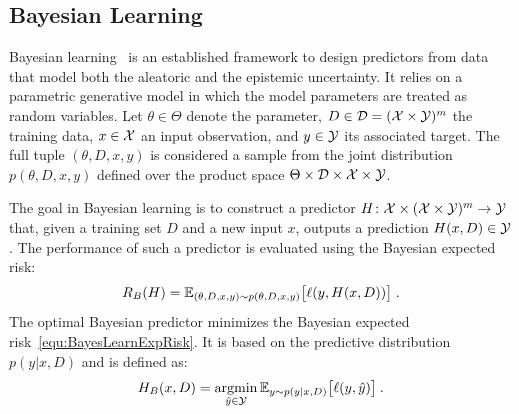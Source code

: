 \subsection{Bayesian Learning}

Bayesian learning~\cite{Bishop-PRML-2006,Gelman-Bayesian-2013} is an established framework to design predictors from data that model both the aleatoric and the epistemic uncertainty. It relies on a parametric generative model in which the model parameters are treated as random variables. Let $\theta \in \Theta$ denote the parameter, $D \in {\cal D} = ({\cal X} \times {\cal Y})^m$ the training data, $x \in {\cal X}$ an input observation, and $y \in {\cal Y}$ its associated target. The full tuple $(\theta,D,x,y)$ is considered a sample from the joint distribution $p(\theta,D,x,y)$ defined over the product space $\Theta\times{\cal D}\times{\cal X}\times{\cal Y}$.

The goal in Bayesian learning is to construct a predictor $H \colon {\cal X} \times ({\cal X} \times {\cal Y})^m \rightarrow {\cal Y}$ that, given a training set $D$ and a new input $x$, outputs a prediction $H(x, D) \in {\cal Y}$. The performance of such a predictor is evaluated using the Bayesian expected risk:
\begin{multline}
\label{equ:BayesLearnExpRisk}
R_B(H) = 
 {\mathbb{E}}_{(\theta,D,x,y)\sim p(\theta,D,x,y)} \big[\ell(y, H(x, D))\big]\;.
\end{multline}
%
The optimal Bayesian predictor minimizes the Bayesian expected risk~\eqref{equ:BayesLearnExpRisk}. It is based on the predictive distribution
$p(y|x,D)$ and is defined as:
\begin{equation}
\label{equ:LernPredictorBayes}
H_B(x, D) = \mathop{\rm argmin}_{\hat{y} \in {\cal Y}} {\mathbb{E}}_{y\sim p(y|x,D)}\big [ \ell(y, \hat{y}) \big ] \:.
\end{equation}
%


